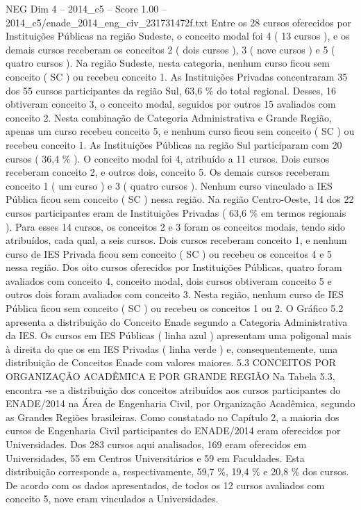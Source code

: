 \begin{textsample}{NEG Dim 4 – 2014\_c5 – Score 1.00 – 2014\_c5/enade\_2014\_eng\_civ\_231731472f.txt}
Entre os 28 cursos oferecidos por Instituições Públicas na região Sudeste, o conceito modal foi 4 ( 13 cursos ), e os demais cursos receberam os conceitos 2 ( dois cursos ), 3 ( nove cursos ) e 5 ( quatro cursos ).
Na região Sudeste, nesta categoria, nenhum curso ficou sem conceito ( SC ) ou recebeu conceito 1.
As Instituições Privadas concentraram 35 dos 55 cursos participantes da região Sul, 63,6 \% do total regional.
Desses, 16 obtiveram conceito 3, o conceito modal, seguidos por outros 15 avaliados com conceito 2.
Nesta combinação de Categoria Administrativa e Grande Região, apenas um curso recebeu conceito 5, e nenhum curso ficou sem conceito ( SC ) ou recebeu conceito 1.
As Instituições Públicas na região Sul participaram com 20 cursos ( 36,4 \% ).
O conceito modal foi 4, atribuído a 11 cursos.
Dois cursos receberam conceito 2, e outros dois, conceito 5.
Os demais cursos receberam conceito 1 ( um curso ) e 3 ( quatro cursos ).
Nenhum curso vinculado a IES Pública ficou sem conceito ( SC ) nessa região.
Na região Centro-Oeste, 14 dos 22 cursos participantes eram de Instituições Privadas ( 63,6 \% em termos regionais ).
Para esses 14 cursos, os conceitos 2 e 3 foram os conceitos modais, tendo sido atribuídos, cada qual, a seis cursos.
Dois cursos receberam conceito 1, e nenhum curso de IES Privada ficou sem conceito ( SC ) ou recebeu os conceitos 4 e 5 nessa região.
Dos oito cursos oferecidos por Instituições Públicas, quatro foram avaliados com conceito 4, conceito modal, dois cursos obtiveram conceito 5 e outros dois foram avaliados com conceito 3.
Nesta região, nenhum curso de IES Pública ficou sem conceito ( SC ) ou recebeu os conceitos 1 ou 2.
O Gráfico 5.2 apresenta a distribuição do Conceito Enade segundo a Categoria Administrativa da IES.
Os cursos em IES Públicas ( linha azul ) apresentam uma poligonal mais à direita do que os em IES Privadas ( linha verde ) e, consequentemente, uma distribuição de Conceitos Enade com valores maiores. 5.3 CONCEITOS POR ORGANIZAÇÃO ACADÊMICA E POR GRANDE REGIÃO Na Tabela 5.3, encontra -se a distribuição dos conceitos atribuídos aos cursos participantes do ENADE/2014 na Área de Engenharia Civil, por Organização Acadêmica, segundo as Grandes Regiões brasileiras.
Como constatado no Capítulo 2, a maioria dos cursos de Engenharia Civil participantes do ENADE/2014 eram oferecidos por Universidades.
Dos 283 cursos aqui analisados, 169 eram oferecidos em Universidades, 55 em Centros Universitários e 59 em Faculdades.
Esta distribuição corresponde a, respectivamente, 59,7 \%, 19,4 \% e 20,8 \% dos cursos.
De acordo com os dados apresentados, de todos os 12 cursos avaliados com conceito 5, nove eram vinculados a Universidades.

\end{textsample}
